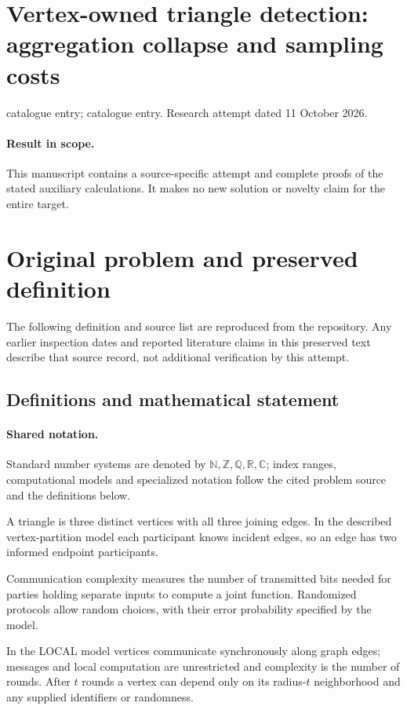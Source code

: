 \documentclass[11pt]{article}
\begin{document}
\section*{Vertex-owned triangle detection: aggregation collapse and sampling costs}
\noindent catalogue entry; catalogue entry. Research attempt dated 11 October 2026.
\paragraph{Result in scope.}This manuscript contains a source-specific attempt and complete proofs of the stated auxiliary calculations. It makes no new solution or novelty claim for the entire target.
\section{Original problem and preserved definition}
The following definition and source list are reproduced from the repository. Any earlier inspection dates and reported literature claims in this preserved text describe that source record, not additional verification by this attempt.
\subsection{Definitions and mathematical statement}

\paragraph{Shared notation.}Standard number systems are denoted by $\mathbb N,\mathbb Z,\mathbb Q,\mathbb R,\mathbb C$; index ranges, computational models and specialized notation follow the cited problem source and the definitions below.


A triangle is three distinct vertices with all three joining edges. In the described vertex-partition model each participant knows incident edges, so an edge has two informed endpoint participants.

Communication complexity measures the number of transmitted bits needed for parties holding separate inputs to compute a joint function. Randomized protocols allow random choices, with their error probability specified by the model.

In the LOCAL model vertices communicate synchronously along graph edges; messages and local computation are unrestricted and complexity is the number of rounds. After $t$ rounds a vertex can depend only on its radius-$t$ neighborhood and any supplied identifiers or randomness.
\end{document}

